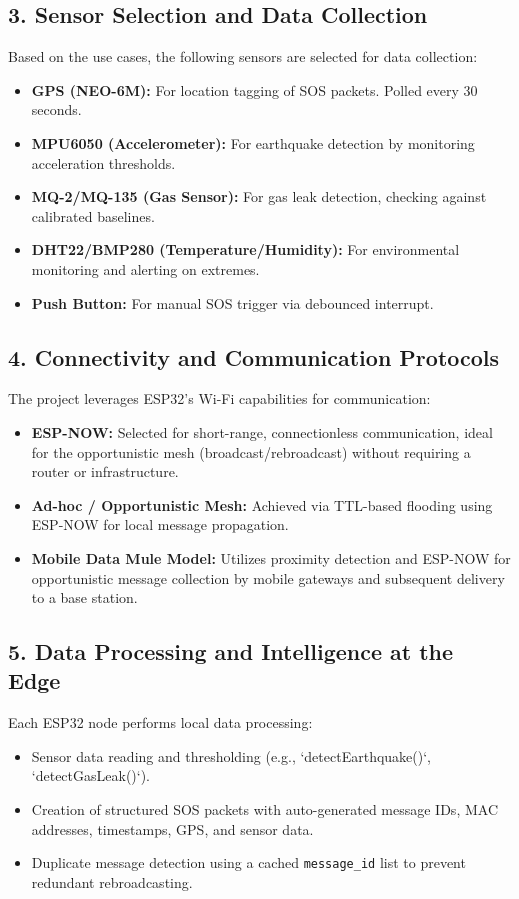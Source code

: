 \documentclass[12pt, a4paper]{article}
\begin{document}
\subsection{3. Sensor Selection and Data Collection}
Based on the use cases, the following sensors are selected for data collection:
\begin{itemize}
    \item \textbf{GPS (NEO-6M):} For location tagging of SOS packets. Polled every 30 seconds.
    \item \textbf{MPU6050 (Accelerometer):} For earthquake detection by monitoring acceleration thresholds.
    \item \textbf{MQ-2/MQ-135 (Gas Sensor):} For gas leak detection, checking against calibrated baselines.
    \item \textbf{DHT22/BMP280 (Temperature/Humidity):} For environmental monitoring and alerting on extremes.
    \item \textbf{Push Button:} For manual SOS trigger via debounced interrupt.
\end{itemize}

\subsection{4. Connectivity and Communication Protocols}
The project leverages ESP32's Wi-Fi capabilities for communication:
\begin{itemize}
    \item \textbf{ESP-NOW:} Selected for short-range, connectionless communication, ideal for the opportunistic mesh (broadcast/rebroadcast) without requiring a router or infrastructure.
    \item \textbf{Ad-hoc / Opportunistic Mesh:} Achieved via TTL-based flooding using ESP-NOW for local message propagation.
    \item \textbf{Mobile Data Mule Model:} Utilizes proximity detection and ESP-NOW for opportunistic message collection by mobile gateways and subsequent delivery to a base station.
\end{itemize}

\subsection{5. Data Processing and Intelligence at the Edge}
Each ESP32 node performs local data processing:
\begin{itemize}
    \item Sensor data reading and thresholding (e.g., `detectEarthquake()`, `detectGasLeak()`).
    \item Creation of structured SOS packets with auto-generated message IDs, MAC addresses, timestamps, GPS, and sensor data.
    \item Duplicate message detection using a cached \texttt{message\_id} list to prevent redundant rebroadcasting.
\end{itemize}
\end{document}
